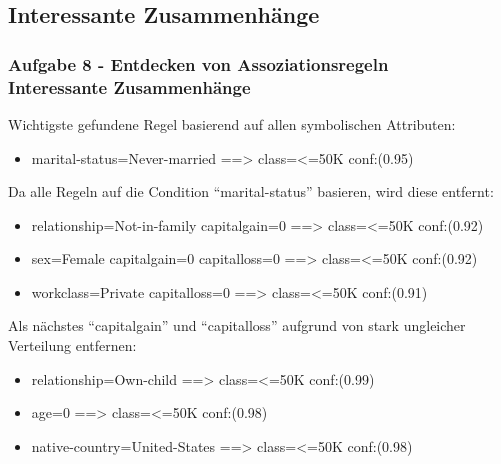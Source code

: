 \documentclass[accentcolor=tud10b,colorbacktitle,inverttitle,landscape,german,presentation,t]{tudbeamer}
\begin{document}
    \subsection{Interessante Zusammenhänge}
    
    \begin{frame}[t]
    \frametitle{Aufgabe 8 - Entdecken von Assoziationsregeln\\ Interessante Zusammenhänge}
        Wichtigste gefundene Regel basierend auf allen symbolischen Attributen:
        \begin{itemize}
            \item marital-status=Never-married ==> class=<=50K conf:(0.95)
        \end{itemize}
        Da alle Regeln auf die Condition ``marital-status'' basieren, wird diese entfernt:
        \begin{itemize}
            \item relationship=Not-in-family capitalgain=0 ==> class=<=50K conf:(0.92)
            \item sex=Female capitalgain=0 capitalloss=0 ==> class=<=50K conf:(0.92)
            \item workclass=Private capitalloss=0 ==> class=<=50K conf:(0.91)
        \end{itemize}
        Als nächstes ``capitalgain'' und ``capitalloss'' aufgrund von stark ungleicher Verteilung entfernen:
        \begin{itemize}
            \item relationship=Own-child ==> class=<=50K conf:(0.99)
            \item age=0 ==> class=<=50K conf:(0.98)
            \item native-country=United-States ==> class=<=50K conf:(0.98)
        \end{itemize}
    \end{frame}
    
\end{document}
